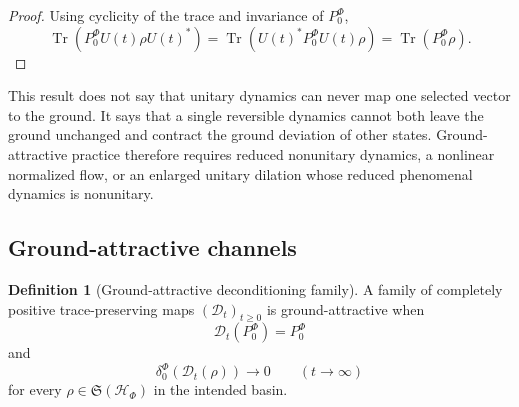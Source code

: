 \documentclass[11pt,reqno]{scrartcl}
\newcommand{\scrHF}{\mathscr H_{\Phi}}
\newcommand{\PzeroF}{P_{0}^{\Phi}}
\DeclareMathOperator{\Tr}{Tr}
\theoremstyle{plain}
\theoremstyle{definition}
\newtheorem{definition}[definition]{Definition}
\theoremstyle{remark}
\begin{document}
\begin{proof}
Using cyclicity of the trace and invariance of $\PzeroF$,
\begin{equation}
  \Tr\!\left(\PzeroF U(t)\rho U(t)^*\right)
  =\Tr\!\left(U(t)^*\PzeroF U(t)\rho\right)
  =\Tr(\PzeroF\rho).
\end{equation}
\end{proof}

This result does not say that unitary dynamics can never map one selected
vector to the ground.  It says that a single reversible dynamics cannot both
leave the ground unchanged and contract the ground deviation of other states.
Ground-attractive practice therefore requires reduced nonunitary dynamics, a
nonlinear normalized flow, or an enlarged unitary dilation whose reduced
phenomenal dynamics is nonunitary.

\subsection{Ground-attractive channels}

\begin{definition}[Ground-attractive deconditioning family]
\label{def:ground-attractive-family}
A family of completely positive trace-preserving maps
$(\mathcal D_t)_{t\geq0}$ is ground-attractive when
\begin{equation}
  \mathcal D_t(\PzeroF)=\PzeroF
  \label{eq:deconditioning-ground-fixed}
\end{equation}
and
\begin{equation}
  \delta_0^{\Phi}(\mathcal D_t(\rho))
  \longrightarrow0
  \qquad(t\to\infty)
  \label{eq:deconditioning-attraction}
\end{equation}
for every $\rho\in\mathfrak S(\scrHF)$ in the intended basin.
\end{definition}
\end{document}
